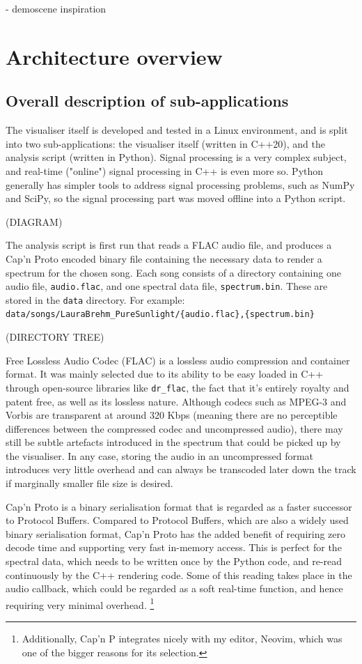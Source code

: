 \documentclass[11pt]{article}
\begin{document}
- demoscene inspiration

\section{Architecture overview}
\subsection{Overall description of sub-applications}
The visualiser itself is developed and tested in a Linux environment, and is split into two sub-applications:
the visualiser itself (written in C++20), and the analysis script (written in Python). Signal processing is a
very complex subject, and real-time ("online") signal processing in C++ is even more so. Python generally has
simpler tools to address signal processing problems, such as NumPy and SciPy, so the signal processing part
was moved offline into a Python script.

(DIAGRAM)

The analysis script is first run that reads a FLAC \cite{xiphFLACWhat} audio file, and produces a Cap'n Proto
\cite{capnp} encoded binary file containing the necessary data to render a spectrum for the chosen song. Each
song consists of a directory containing one audio file, \verb|audio.flac|, and one spectral data file,
\verb|spectrum.bin|. These are stored in the \verb|data| directory. For example: \\
\verb|data/songs/LauraBrehm_PureSunlight/{audio.flac},{spectrum.bin}|

(DIRECTORY TREE)

Free Lossless Audio Codec (FLAC) is a lossless audio compression and container format. It was mainly selected
due to its ability to be easy loaded in C++ through open-source libraries like \verb|dr_flac|, the fact that
it's entirely royalty and patent free, as well as its lossless nature. Although codecs such as MPEG-3 and
Vorbis are transparent at around 320 Kbps (meaning there are no perceptible differences between the compressed
codec and uncompressed audio), there may still be subtle artefacts introduced in the spectrum that could be
picked up by the visualiser. In any case, storing the audio in an uncompressed format introduces very little
overhead and can always be transcoded later down the track if marginally smaller file size is desired.

Cap'n Proto is a binary serialisation format that is regarded as a faster successor to Protocol Buffers.
Compared to Protocol Buffers, which are also a widely used binary serialisation format, Cap'n Proto has the
added benefit of requiring zero decode time and supporting very fast in-memory access. This is perfect for the
spectral data, which needs to be written once by the Python code, and re-read continuously by the C++
rendering code. Some of this reading takes place in the audio callback, which could be regarded as a soft
real-time function, and hence requiring very minimal overhead.
\footnote{Additionally, Cap'n P integrates nicely with my editor, Neovim, which was one of the bigger reasons
for its selection.}
\end{document}
